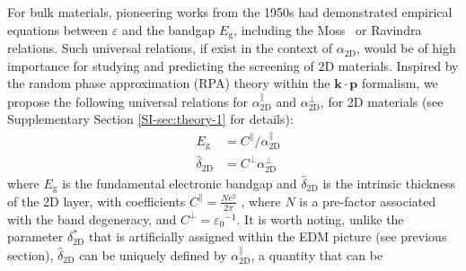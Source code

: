 \documentclass[journal=ancac3,manuscript=article,email=true,hyperref=true,keywords=false]{achemso}
\begin{document}
For bulk materials, pioneering works from the 1950s had demonstrated
empirical equations between $\varepsilon$ and the bandgap
$E_{\mathrm{g}}$, including the
Moss~\cite{Moss_1950_relation,Moss_1985_n_Eg,Finkenrath_1988} or
Ravindra~\cite{Ravindra_1980_model,Ravindra_1979_eps_Eg} relations.
Such universal relations, if exist in the context of
$\alpha_{\mathrm{2D}}$, would be of high importance for studying and
predicting the screening of 2D materials.  Inspired by the random
phase approximation (RPA) theory \cite{Adler_1962} within the
$\mathbf{k} \cdot \mathbf{p}$
formalism\cite{kittel_2005_introduction,Jiang_2017_Eg_Eb}, we propose the following 
universal relations for $\alpha_{\mathrm{2D}}^{\parallel}$ and $\alpha_{\mathrm{2D}}^{\perp}$,
for 2D materials (see Supplementary Section \ref{SI-sec:theory-1} for details): 
\begin{subequations}
\begin{eqnarray}
\label{eq:2D-Moss-para}
  &E_{\mathrm{g}} &= C^{\parallel}/ \alpha_{\mathrm{2D}}^{\parallel} \\
  \label{eq:2D-Moss-perp}
  &\hat{\delta}_{\mathrm{2D}} & = C^{\perp} \alpha_{\mathrm{2D}}^{\perp} 
\end{eqnarray}
\end{subequations}
where $E_{\mathrm{g}}$ is the fundamental electronic bandgap and
$\hat{\delta}_{\mathrm{2D}}$ is the intrinsic thickness of the 2D
layer, with coefficients
$C^{\parallel} = {\displaystyle \frac{Ne^2}{2 \pi}}$
\cite{Jiang_2017_Eg_Eb}, where $N$ is a pre-factor associated with the
band degeneracy, and $C^{\perp} = {\varepsilon_{0}}^{-1}$. It is worth
noting, unlike the parameter $\delta^{*}_{\mathrm{2D}}$ that is
artificially assigned within the EDM picture (see previous section),
$\hat{\delta}_{\mathrm{2D}}$ can be uniquely defined by
$\alpha_{\mathrm{2D}}^{\parallel}$, a quantity that can be 
\end{document}
